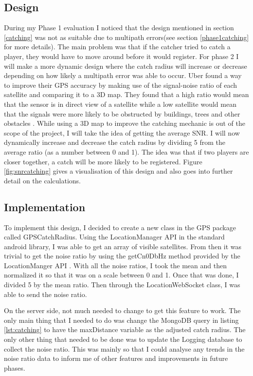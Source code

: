 \documentclass{l4proj}
\begin{document}
\subsection{Design}
\label{phase2catchingdesign}
During my Phase 1 evaluation I noticed that the design mentioned in section \ref{catching} was not as suitable due to 
multipath errors(see section \ref{phase1catching} for more details). The main problem was that if the catcher tried
to catch a player, they would have to move around before it would register. For phase 2 I will make a more dynamic design
where the catch radius will increase or decrease depending on how likely a multipath error was able to occur. Uber found
a way to improve their GPS accuracy by making use of the signal-noise ratio of each satellite and comparing it to a 3D map.
They found that a high ratio would mean that the sensor is in direct view of a satellite while a low satellite would mean that
the signals were more likely to be obstructed by buildings, trees and other obstacles \citep{uberGPS}. While using a 3D map
to improve the catching mechanic is out of the scope of the project, I will take the idea of getting the average SNR. I will
now dynamically increase and decrease the catch radius by dividing 5 from the average ratio (as a number between 0 and 1). The idea
was that if two players are closer together, a catch will be more likely to be registered. Figure \ref{fig:snrcatching} gives a
visualisation of this design and also goes into further detail on the calculations.

\subsection{Implementation}
To implement this design, I decided to create a new class in the GPS package called GPSCatchRadius. Using the LocationManager API in the standard
android library, I was able to get an array of visible satellites. From then it was trivial to
get the noise ratio by using the getCn0DbHz method provided by the LocationManger API \citep{locationManager}. With all
the noise ratios, I took the mean and then normalized it so that it was on a scale between 0 and 1. Once that was done,
I divided 5 by the mean ratio. Then through the LocationWebSocket class, I was able to send the noise ratio.

On the server side, not much needed to change to get this feature to work. The only main thing that I needed to
do was change the MongoDB query in listing \ref{lst:catching} to have the maxDistance variable as the adjusted catch radius. The
only other thing that needed to be done was to update the Logging database to collect the noise ratio. This was mainly
so that I could analyse any trends in the noise ratio data to inform me of other features and improvements
in future phases.
\end{document}
